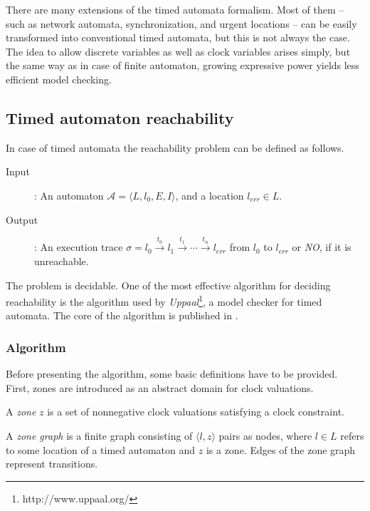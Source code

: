 There are many extensions of the timed automata formalism. Most of them -- such as network automata, synchronization, and urgent locations -- can be easily transformed into conventional timed automata, but this is not always the case. The idea to allow discrete variables as well as clock variables arises simply, but the same way as in case of finite automaton, growing expressive power yields less efficient model checking.


\subsection{Timed automaton reachability} \label{sec:tareach}

In case of timed automata the reachability problem can be defined as follows.

\begin{description}
	\item [Input]: An automaton $\mathcal{A}=\langle L, l_0,
	E, I\rangle$, and a location $l_{err} \in L$.
	\item[Output]: An execution trace $\sigma=l_0 \xrightarrow{t_0} l_1 \xrightarrow{t_1} \cdots \xrightarrow{t_n} l_{err}$ from $l_0$ to $l_{err}$ or \emph{NO}, if it is unreachable.
\end{description}

The problem is decidable. One of the most effective algorithm for deciding reachability is the algorithm used by \emph{Uppaal}\footnote{http://www.uppaal.org/}, a model checker for timed automata. The core of the algorithm is published in \cite{bengtsson2004timed}.
\subsubsection{Algorithm}

Before presenting the algorithm, some basic definitions have to be provided. First, zones are introduced as an abstract domain for clock valuations.

\begin{dfn}
	A \emph{zone} $z$ is a set of nonnegative clock valuations satisfying a clock constraint.
\end{dfn}


\begin{dfn}
	A \emph{zone graph} is a finite graph consisting of $\langle l,z \rangle$ pairs as nodes, where $l \in L$ refers to some location of a timed automaton and $z$ is a zone. Edges of the zone graph represent transitions. 
\end{dfn}

